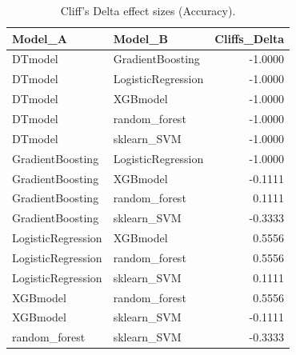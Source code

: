 \begin{table}[t]
\centering
\begin{tabular}{llr}
\toprule
Model_A & Model_B & Cliffs_Delta \\
\midrule
DTmodel & GradientBoosting & -1.0000 \\
DTmodel & LogisticRegression & -1.0000 \\
DTmodel & XGBmodel & -1.0000 \\
DTmodel & random_forest & -1.0000 \\
DTmodel & sklearn_SVM & -1.0000 \\
GradientBoosting & LogisticRegression & -1.0000 \\
GradientBoosting & XGBmodel & -0.1111 \\
GradientBoosting & random_forest & 0.1111 \\
GradientBoosting & sklearn_SVM & -0.3333 \\
LogisticRegression & XGBmodel & 0.5556 \\
LogisticRegression & random_forest & 0.5556 \\
LogisticRegression & sklearn_SVM & 0.1111 \\
XGBmodel & random_forest & 0.5556 \\
XGBmodel & sklearn_SVM & -0.1111 \\
random_forest & sklearn_SVM & -0.3333 \\
\bottomrule
\end{tabular}
\caption{Cliff's Delta effect sizes (Accuracy).}
\label{tab:cliffs_Accuracy}
\end{table}